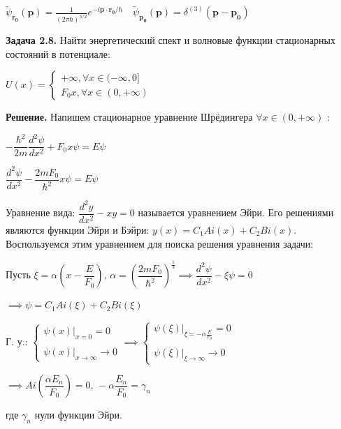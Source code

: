 \documentclass[a4paper, 12pt]{article}
\begin{document}
	$\tilde{\psi}_{\mathbf{r_0}}(\mathbf{p}) = \frac{1}{(2\pi\hbar)^{3/2}} e^{-i\mathbf{p}\cdot\mathbf{r_0}/\hbar} \quad \tilde{\psi}_{\mathbf{p_0}}(\mathbf{p}) = \delta^{(3)}(\mathbf{p} - \mathbf{p_0}) $
	
	
	\quad \textbf{Задача 2.8.} Найти энергетический спект и волновые функции стационарных состояний в потенциале: 
	
	\begin{center}
		$U(x) = \begin{cases}
			+\infty, \forall x \in (-\infty, 0] \\
			F_0 x, \forall x \in (0, +\infty)
		\end{cases}$
	\end{center} 
	
	\quad \textbf{Решение.} Напишем стационарное уравнение Шрёдингера $\forall x \in (0, +\infty)$ : 
	
	\begin{center}
		$-\dfrac{\hbar^2}{2m}\dfrac{d^2 \psi}{dx^2} + F_0 x \psi = E\psi$ 
		
		$\dfrac{d^2 \psi}{dx^2} -\dfrac{2mF_0}{\hbar^2} x \psi= E\psi$
	\end{center}
	
	\quad Уравнение вида: $\dfrac{d^2 y}{dx^2} - xy = 0$ называется уравнением Эйри. Его решениями являются функции Эйри и Бэйри: $y(x) = C_1 Ai (x) + C_2 Bi (x)$. Воспользуемся этим уравнением для поиска решения уравнения задачи: 
	
	\begin{center}
		Пусть $\xi = \alpha \left( x - \dfrac{E}{F_0} \right)\text{, } \alpha = \left(\dfrac{2mF_0}{\hbar^2}\right)^{\frac{1}{3}} \implies \dfrac{d^2 \psi}{dx^2 } - \xi\psi = 0$
		
		$\implies \psi = C_1 Ai(\xi) + C_2 Bi(\xi) $
		
		Г. у.: $\begin{cases}
			\psi (x) \bigg|_{x = 0} = 0 \\ 
			\\
			\psi (x) \bigg|_{x \to \infty} \to 0 
		\end{cases} \implies \begin{cases}
			\psi (\xi) \bigg|_{\xi = -\alpha\frac{E}{F_0}} = 0 \\ 
			\\
			\psi (\xi) \bigg|_{\xi \to \infty} \to 0 
		\end{cases}$
		
		$\implies Ai\left(\dfrac{\alpha E_n}{F_0}\right) = 0\text{, } -\alpha\dfrac{E_n}{F_0} = \gamma_n$
		
		где $\gamma_n$ нули функции Эйри. 
	\end{center}
	
\end{document}
